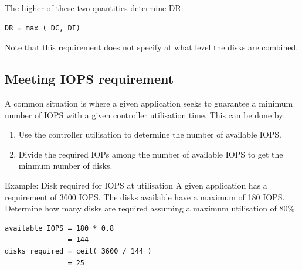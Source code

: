 The higher of these two quantities determine DR:

\begin{verbatim}
DR = max ( DC, DI) 
\end{verbatim}

Note that this requirement does not specify at what level the disks are
combined.

\subsection{Meeting IOPS requirement}\label{meeting-iops-requirement}

A common situation is where a given application seeks to guarantee a
minimum number of IOPS with a given controller utilisation time. This
can be done by:

\begin{enumerate}
\def\labelenumi{\arabic{enumi}.}
\item
  Use the controller utilisation to determine the number of available
  IOPS.
\item
  Divide the required IOPs among the number of available IOPS to get the
  minmum number of disks.
\end{enumerate}

Example: Disk required for IOPS at utilisation A given application has a
requirement of 3600 IOPS. The disks available have a maximum of 180
IOPS. Determine how many disks are required assuming a maximum
utilisation of 80\%

\begin{verbatim}
available IOPS = 180 * 0.8
               = 144
disks required = ceil( 3600 / 144 )
               = 25
\end{verbatim}